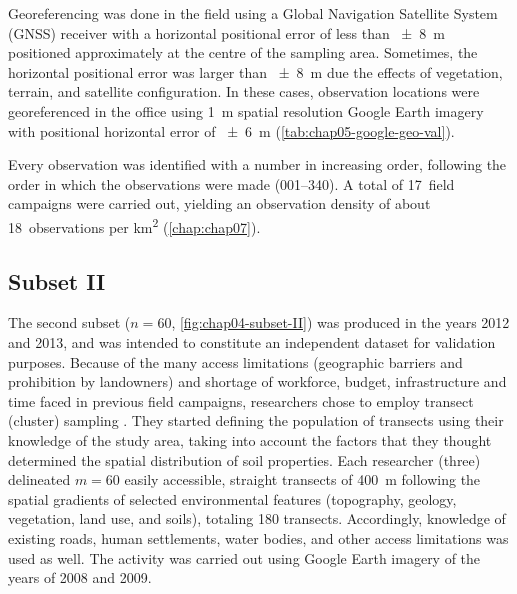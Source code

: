 Georeferencing was done in the field using a Global Navigation Satellite System (GNSS) receiver with a 
horizontal positional error of less than \SI{\pm8}{\metre} positioned approximately at the centre of the
sampling area. Sometimes, the horizontal positional error was larger than \SI{\pm8}{\metre} due the effects
of vegetation, terrain, and satellite configuration. In these cases, observation locations were georeferenced 
in the office using \SI{1}{\metre} spatial resolution Google Earth\rr{} imagery with positional horizontal 
error of \SI{\pm6}{\metre} (\autoref{tab:chap05-google-geo-val}).

Every observation was identified with a number in increasing order, following the order in which the 
observations were made (\num{001}--\num{340}). A total of \num{17}~field campaigns were carried out, yielding 
an observation density of about \num{18}~observations per \si{\kilo\metre\squared} (\autoref{chap:chap07}).

\subsection{Subset II}
\label{sec:chap04-subset-ii}

The second subset ($n = 60$, \autoref{fig:chap04-subset-II}) was produced in the years \num{2012} and 
\num{2013}, and was intended to constitute an independent dataset for validation purposes. Because of the many 
access limitations (geographic barriers and prohibition by landowners) and shortage of workforce, budget, 
infrastructure and time faced in previous field campaigns, researchers chose to employ transect (cluster) 
sampling \cite{MiguelEtAl2012, Moura-BuenoEtAl2012, Samuel-RosaEtAl2013}. They started defining the population 
of transects using their knowledge of the study area, taking into account the factors that they thought 
determined the spatial distribution of soil properties. Each researcher (three) delineated $m = 60$ easily 
accessible, straight transects of \SI{400}{\metre} following the spatial gradients of selected environmental 
features (topography, geology, vegetation, land use, and soils), totaling 180 transects. Accordingly, 
knowledge of existing roads, human settlements, water bodies, and other access limitations was used as well. 
The activity was carried out using Google Earth\rr{} imagery of the years of \num{2008} and \num{2009}.


